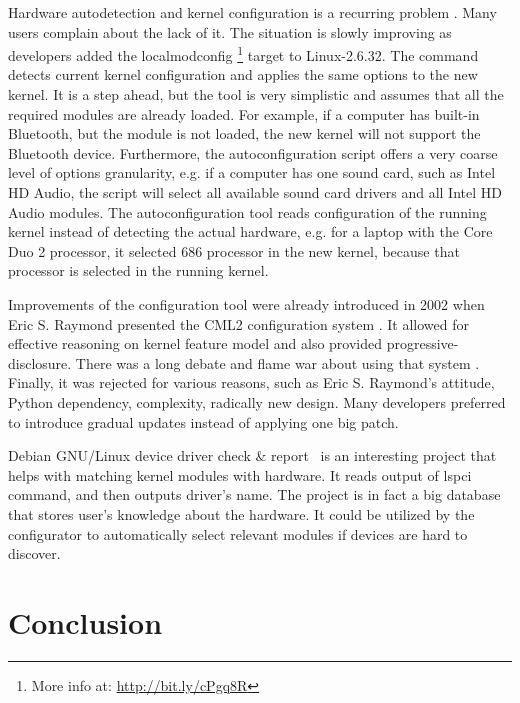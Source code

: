 \documentclass{chi2009}
\begin{document}
Hardware autodetection and kernel configuration is a recurring problem \cite{debian:config:2010,soft32:config:2007}. Many users complain about the lack of it. The situation is slowly improving as developers added the \textsf{localmodconfig} \footnote{More info at: \url{http://bit.ly/cPgq8R}} target to Linux-2.6.32. The command detects current kernel configuration and applies the same options to the new kernel. It is a step ahead, but the tool is very simplistic and assumes that all the required modules are already loaded. For example, if a computer has built-in Bluetooth, but the module is not loaded, the new kernel will not support the Bluetooth device. Furthermore, the autoconfiguration script offers a very coarse level of options granularity, e.g. if a computer has one sound card, such as Intel HD Audio, the script will select all available sound card drivers and all Intel HD Audio modules. The autoconfiguration tool reads configuration of the running kernel instead of detecting the actual hardware, e.g. for a laptop with the Core Duo 2 processor, it selected 686 processor in the new kernel, because that processor is selected in the running kernel.

Improvements of the configuration tool were already introduced in 2002 when Eric S. Raymond presented the CML2 configuration system \cite{raymond:cml2:2000}. It allowed for effective reasoning on kernel feature model and also provided progressive-disclosure. There was a long debate and flame war about using that system \cite{kerneltrap:linux:2002}. Finally, it was rejected for various reasons, such as Eric S. Raymond's attitude, Python dependency, complexity, radically new design. Many developers preferred to introduce gradual updates instead of applying one big patch.

Debian GNU/Linux device driver check \& report~\cite{muto:check:2010} is an interesting project that helps with matching kernel modules with hardware. It reads output of \textsf{lspci} command, and then outputs driver's name. The project is in fact a big database that stores user's knowledge about the hardware. It could be utilized by the configurator to automatically select relevant modules if devices are hard to discover.

\section{Conclusion}\label{sec:conclusion}



\end{document}
